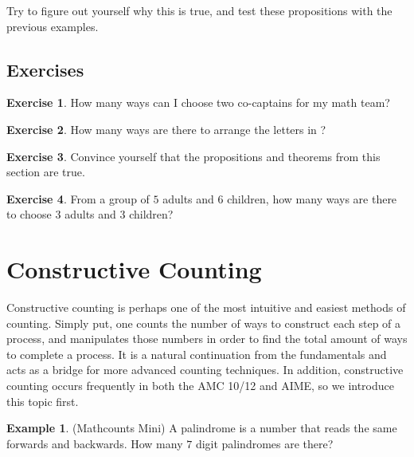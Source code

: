 \documentclass[l1pt]{article}
\theoremstyle{plain}
\theoremstyle{definition}
\newtheorem{example}[thm]{Example}
\newtheorem{exercise}{Exercise}[section]
\theoremstyle{remark}
\begin{document}
Try to figure out yourself why this is true, and test these propositions with the previous examples.

\subsection*{Exercises}

\begin{exercise}
How many ways can I choose two co-captains for my math team?
\end{exercise}

\begin{exercise}
How many ways are there to arrange the letters in ?
\end{exercise}

\begin{exercise}
Convince yourself that the propositions and theorems from this section are true.
\end{exercise}

\begin{exercise}
From a group of $5$ adults and $6$ children, how many ways are there to choose $3$ adults and $3$ children?
\end{exercise}






\section{Constructive Counting}

Constructive counting is perhaps one of the most intuitive and easiest methods of counting. Simply put, one counts the number of ways to construct each step of a process, and manipulates those numbers in order to find the total amount of ways to complete a process. It is a natural continuation from the fundamentals and acts as a bridge for more advanced counting techniques. In addition, constructive counting occurs frequently in both the AMC 10/12 and AIME, so we introduce this topic first.



\begin{example}
(Mathcounts Mini) A palindrome is a number that reads the same forwards and backwards. How many $7$ digit palindromes are there?

\end{example}
\end{document}
